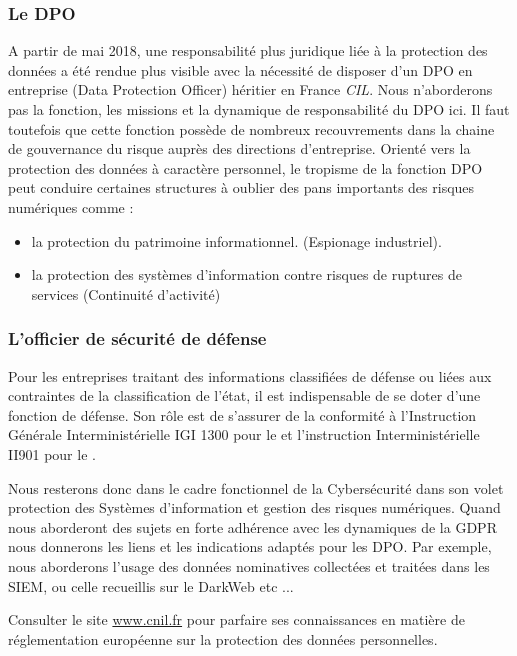 \subsubsection{Le DPO}

A partir de mai 2018, une responsabilité plus juridique liée à la protection des données a été rendue plus visible avec la nécessité de disposer d'un DPO en entreprise (Data Protection Officer) héritier en France  \textit{\gls{CIL}}.
Nous n'aborderons pas la fonction, les missions et la dynamique de responsabilité du DPO ici. Il faut toutefois que cette fonction possède de nombreux recouvrements dans la chaine de gouvernance du risque  auprès des directions d'entreprise. Orienté vers la protection des données à caractère personnel, le tropisme de la fonction DPO peut conduire certaines structures à oublier des pans importants des risques numériques comme :

\begin{itemize}
	\item la protection du patrimoine informationnel. (Espionage industriel).
	\item la protection des systèmes d'information contre risques de ruptures de services (Continuité d'activité)
\end{itemize}

\subsubsection{L'officier de sécurité de défense}
Pour les entreprises traitant des informations classifiées de défense ou liées aux contraintes de la classification de l'état, il est indispensable de se doter d'une fonction  de défense. Son rôle est de s'assurer de la conformité à l'Instruction Générale Interministérielle IGI 1300 pour le  et l'instruction Interministérielle II901 pour le .

Nous resterons donc dans le cadre fonctionnel de la Cybersécurité dans son volet protection des Systèmes d'information et gestion des risques numériques.
Quand nous aborderont des sujets en forte adhérence avec les dynamiques de la \gls{GDPR} nous donnerons les liens et les indications adaptés pour les \gls{DPO}.
Par exemple, nous aborderons l'usage des données nominatives collectées et traitées dans les \gls{SIEM}, ou celle recueillis sur le DarkWeb etc ...
\begin{remark}
Consulter le site \url{www.cnil.fr} pour parfaire ses connaissances en matière de réglementation européenne sur la protection des données personnelles. 
\end{remark}

